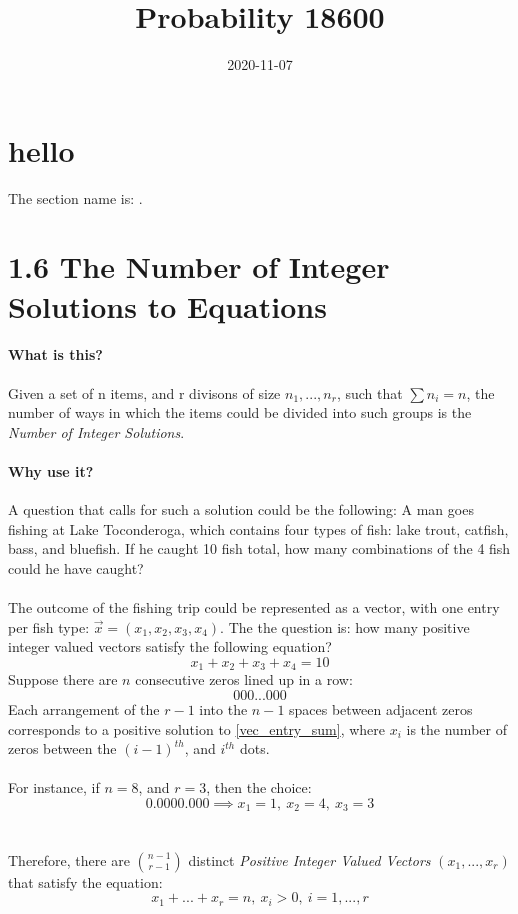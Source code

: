 \documentclass{article}
\title{Probability 18600}
\date{2020-11-07}
\begin{document}
\maketitle
\section{hello}
The section name is: .
\section{1.6 The Number of Integer Solutions to Equations}
\paragraph{What is this?}
Given a set of n items, and r divisons of size $n_1,...,n_r$,
such that $\sum n_{i}=n$, the number of ways in which the items could be divided
into such groups is the \textit{Number of Integer Solutions}.

\paragraph{Why use it?}
A question that calls for such a solution could be the following:
A man goes fishing at Lake Toconderoga, which contains
four types of fish: lake trout, catfish, bass, and bluefish.  If he caught
10 fish total, how many combinations of the 4 fish could he have caught?

\paragraph{}
The outcome of the fishing trip could be represented as a vector, with one entry per fish type:
$\vec{x}=(x_{1},x_{2},x_{3},x_{4})$.
The the question is: how many positive integer valued vectors satisfy the following equation?
\begin{equation}
  \label{vec_entry_sum}
  x_{1}+x_{2}+x_{3}+x_{4}=10
\end{equation}
Suppose there are $n$ consecutive zeros lined up in a row:
\begin{equation*}
  000...000
\end{equation*}
Each arrangement of the $r-1$ into the $n-1$ spaces between adjacent zeros corresponds to a positive
solution to \eqref{vec_entry_sum}, where $x_{i}$ is the number of zeros between the $(i-1)^{th}$, and $i^{th}$ dots.
\\ \\
For instance, if $n=8$, and $r=3$, then the choice:
\begin{equation*}
  0.0000.000 \implies x_{1}=1,~x_{2}=4,~x_{3}=3
\end{equation*}
\\ \\
Therefore, there are $n-1 \choose r-1$ distinct \textit{Positive Integer Valued Vectors} $(x_{1},...,x_{r})$
that satisfy the equation:
\begin{equation*}
  x_{1}+...+x_{r}=n,~x_{i} > 0,~i=1,...,r
\end{equation*}
\end{document}

